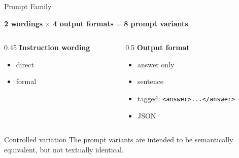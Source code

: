 \documentclass[aspectratio=169,11pt]{beamer}
\begin{document}
\begin{frame}{Prompt Family}
  \begin{center}
    \Large
    \textbf{2 wordings} $\times$ \textbf{4 output formats} = \textbf{8 prompt variants}
  \end{center}

  \vspace{0.8em}
  \begin{columns}[T]
    \begin{column}{0.45\linewidth}
      \textbf{Instruction wording}
      \begin{itemize}
        \item direct
        \item formal
      \end{itemize}
    \end{column}
    \begin{column}{0.5\linewidth}
      \textbf{Output format}
      \begin{itemize}
        \item answer only
        \item sentence
        \item tagged: \texttt{<answer>...</answer>}
        \item JSON
      \end{itemize}
    \end{column}
  \end{columns}

  \vspace{0.8em}
  \begin{block}{Controlled variation}
    The prompt variants are intended to be semantically equivalent, but not textually identical.
  \end{block}
\end{frame}
\end{document}
